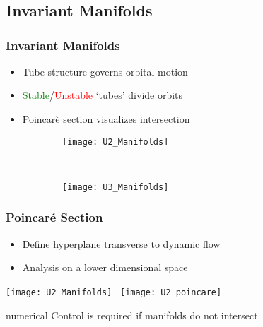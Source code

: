 \section*{}
\subsection*{Invariant Manifolds}

\begin{frame}%
\frametitle{Invariant Manifolds}
\begin{itemize}
	\item Tube structure governs orbital motion
	\item \textcolor{green}{Stable}/\textcolor{red}{Unstable} `tubes' divide orbits
	\item Poincar\`e section visualizes intersection
\end{itemize}
 \begin{figure}
     \centering
        \begin{subfigure}[b]{0.5\textwidth}
                \texttt{[image: U2\_Manifolds]}
        \end{subfigure}%
        ~%
        \begin{subfigure}[b]{0.5\textwidth}
                \texttt{[image: U3\_Manifolds]}
        \end{subfigure}
\end{figure}
\end{frame}%

\begin{frame}%
\frametitle{Poincar\'e Section}
	\begin{itemize}
		\item Define hyperplane transverse to dynamic flow
		\item Analysis on a lower dimensional space
	\end{itemize}

    \texttt{[image: U2\_Manifolds]}~
    \texttt{[image: U2\_poincare]}

	\begin{beamercolorbox}[sep=0.5cm,center]{numerical}
		Control is required if manifolds do not intersect
	\end{beamercolorbox}
\end{frame}%

